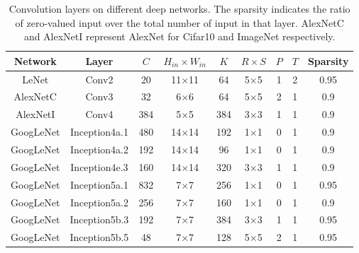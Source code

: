 \documentclass{article}
\begin{document}
\begin{table}[!ht]
\centering
\caption{Convolution layers on different deep networks. The sparsity indicates the ratio of zero-valued input over the total number of input in that layer. AlexNetC and AlexNetI represent AlexNet for Cifar10 and ImageNet respectively.}
\label{table:cnnsum}
\begin{tabular}{|c|c|c|c|c|c|c|c|c|}
\hline
Network &  Layer & $C$ & $H_{in}\times W_{in}$ & $K$ & $R\times S$ & $P$ & $T$ & Sparsity\\\cline{1-9}
\hline
\hline
LeNet & Conv2 & 20 & 11$\times$11 & 64 & 5$\times$5 & 1 & 2 &0.95\\\cline{1-9}
AlexNetC & Conv3 & 32 & 6$\times$6 & 64 & 5$\times$5 & 2 & 1 &0.9\\\cline{1-9}
AlexNetI & Conv4 & 384 & 5$\times$5& 384 & 3$\times$3 & 1 & 1 & 0.9\\\cline{1-9}
GoogLeNet & Inception4a.1 & 480& 14$\times$14& 192 & 1$\times$1 & 0 & 1 & 0.9\\\cline{1-9}
GoogLeNet & Inception4a.2 & 192& 14$\times$14& 96 & 1$\times$1 & 0 & 1 & 0.9\\\cline{1-9}
GoogLeNet & Inception4e.3 & 160& 14$\times$14& 320 & 3$\times$3 & 1 & 1 & 0.9\\\cline{1-9}
GoogLeNet & Inception5a.1 & 832 & 7$\times$7& 256 & 1$\times$1 & 0 & 1 & 0.95\\\cline{1-9}
GoogLeNet & Inception5a.2 & 256&  7$\times$7& 160 & 1$\times$1 & 0 & 1 & 0.9\\\cline{1-9}
GoogLeNet & Inception5b.3 & 192 & 7$\times$7& 384 & 3$\times$3 & 1 & 1 & 0.95 \\\cline{1-9}
GoogLeNet & Inception5b.5 & 48 & 7$\times$7& 128 & 5$\times$5 & 2 & 1 & 0.95 \\\cline{1-9}

\end{tabular}
\end{table}
\end{document}
